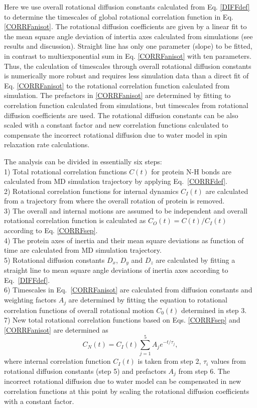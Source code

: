 \documentclass[pre,aps,floatfix,authordate1-4,twocolumn]{revtex4-1}
\begin{document}
Here we use overall rotational diffusion constants
calculated from Eq. \ref{DIFFdef} to determine 
the timescales of global rotational correlation function
in Eq. \ref{CORRFanisot}. The rotational
diffusion coefficients are given by a linear fit
to the mean square angle deviation of intertia axes calculated from
simulations (see results and discussion).
Straight line has only one parameter (slope) to be fitted,
in contrast to multiexponential sum in Eq. \ref{CORRFanisot}
with ten parameters. 
Thus, the calculation of timescales through overall
rotational diffusion constants is numerically more robust and requires
less simulation data than a direct fit of
Eq. \ref{CORRFanisot} to the rotational correlation function calculated
from simulation.
The prefactors in \ref{CORRFanisot} are determined by
fitting to correlation function calculated from simulations,
but timescales from rotational diffusion coefficients are
used. The rotational diffusion constants
can be also scaled with a constant factor and new correlation functions
calculated to compensate the incorrect rotational diffusion due to
water model in spin relaxation rate calculations.


The analysis can be divided in essentially six steps: \\
1) Total rotational correlation functions $C(t)$
for protein N-H bonds are calculated from MD simulation trajectory
by applying Eq.~\ref{CORRFdef}. \\
2) Rotational correlation functions for internal
dynamics $C_I(t)$ are calculated from a trajectory from where the overall
rotation of protein is removed. \\
3) The overall and internal motions are assumed to be independent and overall
rotational correlation function is calculated as $C_O(t)=C(t)/C_I(t)$ according to Eq. \ref{CORRFsep}. \\
4) The protein axes of inertia and their mean square deviations as function of
time are calculated from MD simulation trajectory. \\
5) Rotational diffusion constants $D_x$, $D_y$ and $D_z$ are calculated by fitting a straight line
to mean square angle deviations of inertia axes according to Eq.~\ref{DIFFdef}. \\
6) Timescales in Eq.~\ref{CORRFanisot} are calculated from diffusion constants and
weighting factors $A_j$ are determined by fitting the equation to
rotational correlation functions of overall rotational motion $C_0(t)$ determined in step 3. \\
7) New total rotational correlation functions based on Eqs. \ref{CORRFsep} and \ref{CORRFanisot}
are determined as
\begin{equation}\label{newCORRF}
  C_N(t)=C_I(t)\sum_{j=1}^5 A_j e^{-t/\tau_j},
\end{equation}
where internal correlation function $C_I(t)$ is taken from step 2,
$\tau_i$ values from rotational diffusion constants (step 5) and
prefactors $A_j$ from step 6. The incorrect rotational
diffusion due to water model can be compensated in new correlation
functions at this point
 by scaling the rotational diffusion coefficients with a constant factor.
\end{document}
